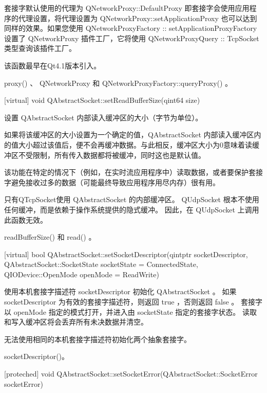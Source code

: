 套接字默认使用的代理为 QNetworkProxy::DefaultProxy 即套接字会使用应用程序的代理设置，将代理设置为 QNetworkProxy::setApplicationProxy 也可以达到同样的效果。如果您使用 QNetworkProxyFactory :: setApplicationProxyFactory 设置了 QNetworkProxy 插件工厂，它将使用 QNetworkProxyQuery :: TcpSocket 类型查询该插件工厂。

该函数最早在Qt4.1版本引入。


\begin{seeAlso}
proxy() 、 QNetworkProxy 和 QNetworkProxyFactory::queryProxy() 。
\end{seeAlso}


[virtual] void QAbstractSocket::setReadBufferSize(qint64 size)

设置 QAbstractSocket 内部读入缓冲区的大小（字节为单位）。

如果将该缓冲区的大小设置为一个确定的值，QAbstractSocket 内部读入缓冲区内的值大小超过该值后，便不会再缓冲数据。与此相反，缓冲区大小为0意味着读缓冲区不受限制，所有传入数据都将被缓冲，同时这也是默认值。

该功能在特定的情况下（例如，在实时流应用程序中）读取数据，或者要保护套接字避免接收过多的数据（可能最终导致应用程序用尽内存）很有用。

只有QTcpSocket使用 QAbstractSocket 的内部缓冲区。 QUdpSocket 根本不使用任何缓冲，而是依赖于操作系统提供的隐式缓冲。 因此，在 QUdpSocket 上调用此函数无效。


\begin{seeAlso}
readBufferSize() 和 read()  。
\end{seeAlso}

[virtual] bool QAbstractSocket::setSocketDescriptor(qintptr
socketDescriptor, QAbstractSocket::SocketState socketState =
ConnectedState, QIODevice::OpenMode openMode = ReadWrite)

使用本机套接字描述符 socketDescriptor 初始化 QAbstractSocket 。 如果 socketDescriptor 为有效的套接字描述符，则返回 true ，否则返回 false 。 套接字以 openMode 指定的模式打开，并进入由 socketState 指定的套接字状态。 读取和写入缓冲区将会丢弃所有未决数据并清空。

\begin{notice}
 无法使用相同的本机套接字描述符初始化两个抽象套接字。
\end{notice}

\begin{seeAlso}
socketDescriptor()。
\end{seeAlso}


[proteched] void
QAbstractSocket::setSocketError(QAbstractSocket::SocketError
socketError)

